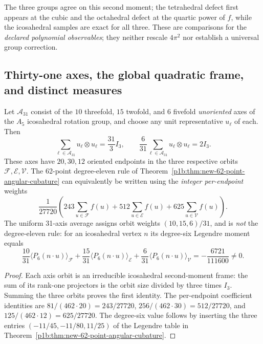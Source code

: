 \documentclass[11pt]{article}
\begin{document}
\begin{remark}
The three groups agree on this second moment; the tetrahedral defect
first appears at the cubic and the octahedral defect at the quartic
power of $f$, while the icosahedral samples are exact for all three.
These are comparisons for the \emph{declared polynomial observables};
they neither rescale $4\pi^2$ nor establish a universal group correction.
\end{remark}

\subsection{Thirty-one axes, the global quadratic frame, and distinct measures}
\label{p1b:subsec:v11-axis-measures}

\begin{proposition}
\label{p1b:prop:v11-axis-frame-and-perpoint}
Let $\mathcal A_{31}$ consist of the $10$ threefold, $15$ twofold,
and $6$ fivefold \emph{unoriented} axes of the $A_5$ icosahedral
rotation group, and choose any unit representative $u_\ell$ of each.
Then
\[
\boxed{\sum_{\ell\in\mathcal A_{31}}
 u_\ell\otimes u_\ell=\frac{31}{3}I_3,\qquad
 \frac6{31}\sum_{\ell\in\mathcal A_{31}}
 u_\ell\otimes u_\ell=2I_3.}
\]
These axes have $20,30,12$ oriented endpoints in the three respective
orbits $\mathcal F,\mathcal E,\mathcal V$.  The 62-point degree-eleven
rule of Theorem~\ref{p1b:thm:new-62-point-angular-cubature}
can equivalently be written using the \emph{integer per-endpoint} weights
\[
\boxed{\frac1{27720}\left(
 243\sum_{u\in\mathcal F}f(u)
 +512\sum_{u\in\mathcal E}f(u)
 +625\sum_{u\in\mathcal V}f(u)\right).}
\]
The uniform 31-axis average assigns orbit weights
$(10,15,6)/31$, and is \emph{not} the degree-eleven rule: for an
icosahedral vertex $n$ its degree-six Legendre moment equals
\[
\boxed{\frac{10}{31}\langle P_6(n\cdot u)\rangle_{\mathcal F}
+\frac{15}{31}\langle P_6(n\cdot u)\rangle_{\mathcal E}
+\frac6{31}\langle P_6(n\cdot u)\rangle_{\mathcal V}
=-\frac{6721}{111600}\ne0.}
\]
\end{proposition}
\begin{proof}
Each axis orbit is an irreducible icosahedral second-moment frame:
the sum of its rank-one projectors is the orbit size divided by three
times $I_3$.  Summing the three orbits proves the first identity.
The per-endpoint coefficient identities are
$81/(462\cdot20)=243/27720$,
$256/(462\cdot30)=512/27720$, and
$125/(462\cdot12)=625/27720$.
The degree-six value follows by inserting the three entries
$(-11/45,-11/80,11/25)$ of the Legendre table in
Theorem~\ref{p1b:thm:new-62-point-angular-cubature}.
\end{proof}
\end{document}
